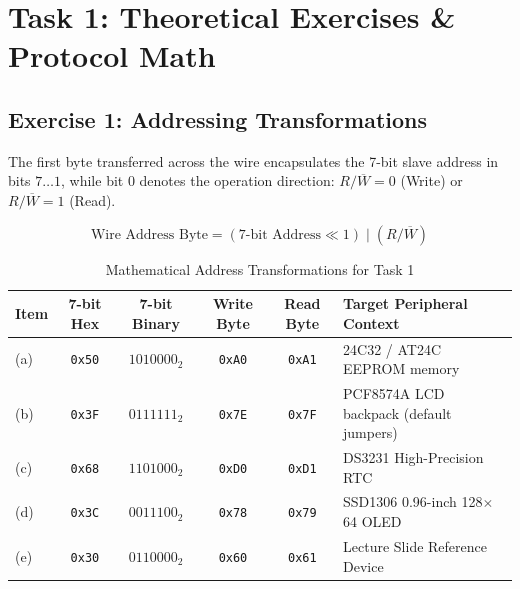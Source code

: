 \documentclass[11pt,a4paper,oneside]{report}
\begin{document}
\chapter{Task 1: Theoretical Exercises \& Protocol Math}

\section{Exercise 1: Addressing Transformations}
The first byte transferred across the wire encapsulates the 7-bit slave address in bits $7\dots 1$, while bit 0 denotes the operation direction: $R/\overline{W} = 0$ (Write) or $R/\overline{W} = 1$ (Read).

\begin{equation}
\text{Wire Address Byte} = (\text{7-bit Address} \ll 1) \;|\; (R/\overline{W})
\end{equation}

\begin{table}[h!]
\centering
\small
\caption{Mathematical Address Transformations for Task 1}
\vspace{4pt}
\begin{tabularx}{\textwidth}{l c c c c X}
\toprule
\textbf{Item} & \textbf{7-bit Hex} & \textbf{7-bit Binary} & \textbf{Write Byte} & \textbf{Read Byte} & \textbf{Target Peripheral Context} \\
\midrule
(a) & \texttt{0x50} & $1010000_2$ & \texttt{0xA0} & \texttt{0xA1} & 24C32 / AT24C EEPROM memory \\
(b) & \texttt{0x3F} & $0111111_2$ & \texttt{0x7E} & \texttt{0x7F} & PCF8574A LCD backpack (default jumpers) \\
(c) & \texttt{0x68} & $1101000_2$ & \texttt{0xD0} & \texttt{0xD1} & DS3231 High-Precision RTC \\
(d) & \texttt{0x3C} & $0011100_2$ & \texttt{0x78} & \texttt{0x79} & SSD1306 0.96-inch 128$\times$64 OLED \\
(e) & \texttt{0x30} & $0110000_2$ & \texttt{0x60} & \texttt{0x61} & Lecture Slide Reference Device \\
\bottomrule
\end{tabularx}
\end{table}
\end{document}
